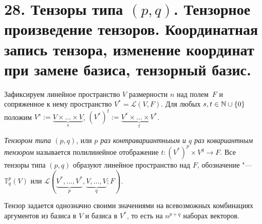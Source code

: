 \section{28. Тензоры типа $(p, q)$. Тензорное произведение тензоров. Координатная запись тензора, изменение координат при замене базиса, тензорный базис.}

Зафиксируем линейное пространство $V$ размерности $n$ над полем~$F$ и сопряженное к нему пространство $V^* = \mathcal{L}(V, F)$. Для любых $s, t \in \mathbb{N} \cup \{0\}$ положим $V^s := \underbrace{V \times \dots \times V}_{s}$, $(V^*)^t := \underbrace{V^* \times \dots \times V^*}_{t}$.

\begin{definition}
	\textit{Тензором типа $(p, q)$}, или \textit{$p$ раз контравариантныым и $q$ раз ковариантным тензором} называется полилинейное отображение $t: (V^*)^p \times V^q \rightarrow F$. Все тензоры типа $(p, q)$ образуют линейное пространство над $F$, обозначение "--- $\mathbb{T}^p_q(V)$ или $\mathcal{L}(\underbrace{V^*, \dots, V^*}_{p}, \underbrace{V, \dots, V}_{q}; F)$.
\end{definition}

\begin{note}
	Тензор задается однозначно своими значениями на всевозможных комбинациях аргументов из базиса в $V$ и базиса в $V^*$, то есть на $n^{p + q}$ наборах векторов.
\end{note}

